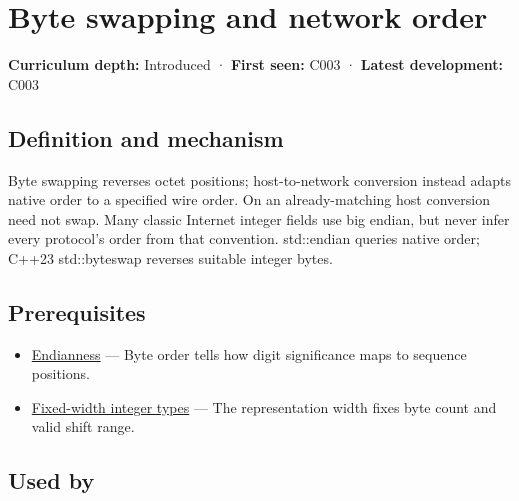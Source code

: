 \hypertarget{appendix-11ba36693aa2}{}\label{referencestart:appendix-11ba36693aa2}
\section{Byte swapping and network order}\label{appendix-11ba36693aa2-byte-swapping-and-network-order}

\hypertarget{appendix-11ba36693aa2-byte-swapping-and-network-order}{}

\textbf{Curriculum depth:} Introduced · \textbf{First seen:} C003 · \textbf{Latest development:} C003

\begin{allmightroledefinition}

\subsection{Definition and mechanism}\label{appendix-11ba36693aa2-definition-and-mechanism}

\hypertarget{appendix-11ba36693aa2-definition-and-mechanism}{}

Byte swapping reverses octet positions; host-to-network conversion instead adapts native order to a specified wire order. On an already-matching host conversion need not swap. Many classic Internet integer fields use big endian, but never infer every protocol's order from that convention. std::endian queries native order; C++23 std::byteswap reverses suitable integer bytes.

\end{allmightroledefinition}

\subsection{Prerequisites}\label{appendix-11ba36693aa2-prerequisites}

\hypertarget{appendix-11ba36693aa2-prerequisites}{}

\begin{itemize}
\tightlist
\item
  \hyperref[appendix-bc07c3d25b18]{Endianness} --- Byte order tells how digit significance maps to sequence positions.
\item
  \hyperref[appendix-cc04044b5782]{Fixed-width integer types} --- The representation width fixes byte count and valid shift range.
\end{itemize}

\subsection{Used by}\label{appendix-11ba36693aa2-used-by}

